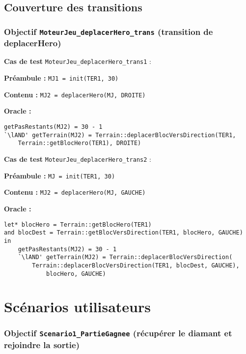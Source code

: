\documentclass{article}
\newcommand{\cmd}[1]{\texttt{#1}}
\newcommand{\lAND}{$\land$}
\newcommand{\obj}[2]{\subsubsection*{\large{\textbf{Objectif {\cmd{#1} (#2)}}}}}
\newenvironment{cas}[1]
{
	\hspace{1em}\textbf{Cas de test} \cmd{#1} :
	\begin{list}{}{}
}{
	\end{list}\vspace{1em}
}
\newcommand{\pre}[1]{\item \textbf{Préambule :} \cmd{#1}}
\newcommand{\ope}[1]{\item \textbf{Contenu :} \cmd{#1}}
\newcommand{\oram}{\item \textbf{Oracle :}}
\begin{document}
\subsection*{Couverture des transitions}

\obj{MoteurJeu\_deplacerHero\_trans} {transition de deplacerHero}
	\begin{cas} {MoteurJeu\_deplacerHero\_trans1}
		\pre{MJ1 = init(TER1, 30)}
		\ope{MJ2 = deplacerHero(MJ, DROITE)}
		\oram{}
		\begin{lstlisting}
getPasRestants(MJ2) = 30 - 1
`\lAND' getTerrain(MJ2) = Terrain::deplacerBlocVersDirection(TER1,
	Terrain::getBlocHero(TER1), DROITE)
		\end{lstlisting}
	\end{cas}

	\begin{cas} {MoteurJeu\_deplacerHero\_trans2}
		\pre{MJ = init(TER1, 30)}
		\ope{MJ2 = deplacerHero(MJ, GAUCHE)}
		\oram{}
		\begin{lstlisting}
let* blocHero = Terrain::getBlocHero(TER1)
and blocDest = Terrain::getBlocVersDirection(TER1, blocHero, GAUCHE)
in
	getPasRestants(MJ2) = 30 - 1
	`\lAND' getTerrain(MJ2) = Terrain::deplacerBlocVersDirection(
		Terrain::deplacerBlocVersDirection(TER1, blocDest, GAUCHE),
			blocHero, GAUCHE)
		\end{lstlisting}
	\end{cas}

\clearpage{}




































\section{Scénarios utilisateurs}

\obj{Scenario1\_PartieGagnee} {récupérer le diamant et rejoindre la sortie}
\end{document}
